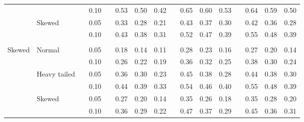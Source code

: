 \documentclass{article} %
\begin{document}
\begin{table}[ht]
\begin{scriptsize}
\begin{center}
\begin{tabular}{ll p{.1cm} c p{.1cm} rrr p{.1cm} rrr p{.1cm} rrr}
             &              && 0.10 &&   0.53 & 0.50 & 0.42 && 0.65 & 0.60 & 0.53 &&  0.64 & 0.59 & 0.50 \\
             & Skewed       && 0.05 &&   0.33 & 0.28 & 0.21 && 0.43 & 0.37 & 0.30 &&  0.42 & 0.36 & 0.28 \\
             &              && 0.10 &&   0.43 & 0.38 & 0.31 && 0.52 & 0.47 & 0.39 &&  0.55 & 0.48 & 0.39 \\
             &&&&&&&&&&&&&&&\\
Skewed       & Normal       && 0.05 &&   0.18 & 0.14 & 0.11 && 0.28 & 0.23 & 0.16 && 0.27 & 0.20 & 0.14 \\ 
             &              && 0.10 &&   0.26 & 0.22 & 0.19 && 0.36 & 0.32 & 0.25 && 0.38 & 0.30 & 0.24 \\ 
             & Heavy tailed && 0.05 &&   0.36 & 0.30 & 0.23 && 0.45 & 0.38 & 0.28 && 0.44 & 0.38 & 0.30 \\ 
             &              && 0.10 &&   0.44 & 0.39 & 0.33 && 0.54 & 0.46 & 0.40 && 0.55 & 0.48 & 0.39 \\ 
             & Skewed       && 0.05 &&   0.27 & 0.20 & 0.14 && 0.35 & 0.26 & 0.18 && 0.35 & 0.28 & 0.20 \\ 
             &              && 0.10 &&   0.36 & 0.29 & 0.22 && 0.47 & 0.37 & 0.29 && 0.45 & 0.36 & 0.31 \\ 



\end{tabular}
\end{center}
\end{scriptsize}
\end{table}
\end{document}
